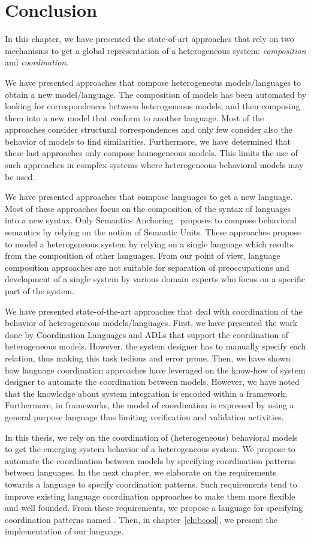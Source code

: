 \section{Conclusion}
In this chapter, we have presented the state-of-art approaches that rely on two mechanisms to get a global representation of a heterogeneous system: \emph{composition} and \emph{coordination}. 

We have presented approaches that compose heterogeneous models/languages to obtain a new model/language. The composition of models has been automated by looking for correspondences between heterogeneous models, and then composing them into a new model that conform to another language. Most of the approaches consider structural correspondences and only few consider also the behavior of models to find similarities. Furthermore, we have determined that these last approaches only compose homogeneous models. This limits the use of such approaches in complex systems where heterogeneous behavioral models may be used. 

We have presented approaches that compose languages to get a new language. Most of these approaches focus on the composition of the syntax of languages into a new syntax. Only Semantics Anchoring~\cite{semanticsanchoring} proposes to compose behavioral semantics by relying on the notion of Semantic Units. These approaches propose to model a heterogeneous system by relying on a single language which results from the composition of other languages. From our point of view, language composition approaches are not suitable for separation of preoccupations and development of a single system by various domain experts who focus on a specific part of the system.

We have presented state-of-the-art approaches that deal with coordination of the behavior of heterogeneous models/languages. First, we have presented the work done by Coordination Languages and ADLs that support the coordination of heterogeneous models. However, the system designer has to manually specify each relation, thus making this task tedious and error prone. Then, we have shown how language coordination approaches have leveraged on the know-how of system designer to automate the coordination between models. However, we have noted that the knowledge about system integration is encoded within a framework. Furthermore, in frameworks, the model of coordination is expressed by using a general purpose language thus limiting verification and validation activities. 

In this thesis, we rely on the coordination of (heterogeneous) behavioral models to get the emerging system behavior of a heterogeneous system. We propose to automate the coordination between models by specifying coordination patterns between languages. In the next chapter, we elaborate on the requirements towards a language to specify coordination patterns. Such requirements tend to improve existing language coordination approaches to make them more flexible and well founded. From these requirements, we propose a language for specifying coordination patterns named \bcool. Then, in chapter~\ref{ch:bcool}, we present the implementation of our language.





